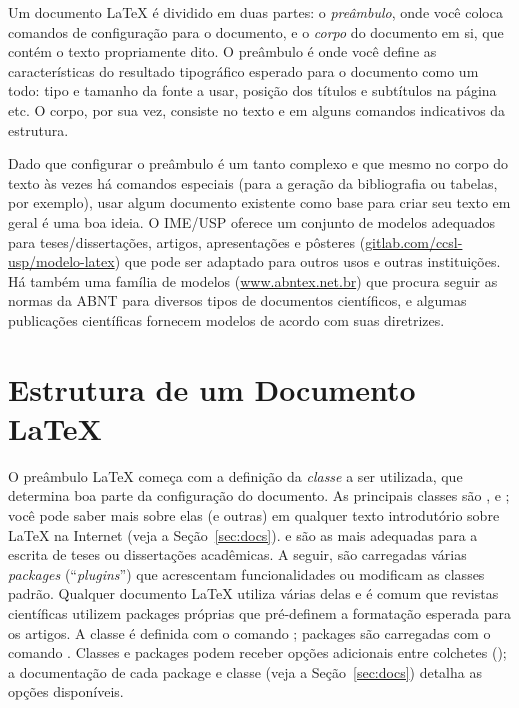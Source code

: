Um documento \LaTeX{} é dividido em duas partes: o \emph{preâmbulo}, onde
você coloca comandos de configuração para o documento, e o \emph{corpo}
do documento em si, que contém o texto propriamente dito. O preâmbulo é
onde você define as características do resultado tipográfico esperado
para o documento como um todo: tipo e tamanho da fonte a usar, posição
dos títulos e subtítulos na página etc. O corpo, por sua vez, consiste no
texto e em alguns comandos indicativos da estrutura.

Dado que configurar o preâmbulo é um tanto complexo e que mesmo no corpo
do texto às vezes há comandos especiais (para a geração da bibliografia
ou tabelas, por exemplo),
usar algum documento existente como base para criar seu texto em geral é
uma boa ideia. O IME/USP oferece um conjunto de modelos adequados para
teses/dissertações, artigos, apresentações e pôsteres (\url{gitlab.com/ccsl-usp/modelo-latex})
que pode ser adaptado para outros usos e outras instituições. Há também uma
família de modelos (\url{www.abntex.net.br}) que procura seguir as normas
da ABNT para diversos tipos de documentos científicos, e algumas publicações
científicas fornecem modelos de acordo com suas diretrizes.

\section{Estrutura de um Documento \LaTeX{}}
\label{sec:basico}

O preâmbulo \LaTeX{} começa com a definição da \emph{classe} a ser utilizada,
que determina boa parte da configuração do documento. As principais classes
são ,  e ; você pode saber mais sobre elas
(e outras) em qualquer texto introdutório sobre \LaTeX{} na Internet (veja a
Seção~\ref{sec:docs}).  e  são as mais adequadas para a
escrita de teses ou dissertações acadêmicas.
A seguir, são carregadas várias \emph{packages} (``\emph{plugins}'') que
acrescentam funcionalidades ou modificam as classes padrão. Qualquer documento
\LaTeX{} utiliza várias delas e é comum que revistas científicas utilizem
packages próprias que pré-definem a formatação esperada para os artigos.
A classe é definida com o comando ;
packages são carregadas com o comando .
Classes e packages podem receber opções adicionais entre colchetes
(); a documentação
de cada package e classe (veja a Seção~\ref{sec:docs}) detalha as opções
disponíveis.

